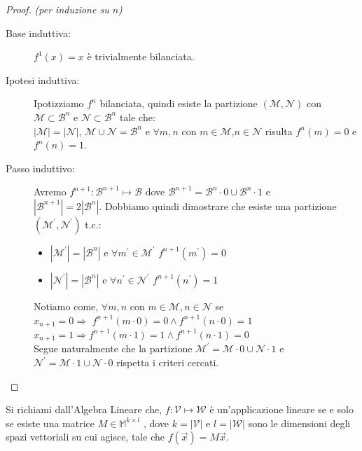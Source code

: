 \documentclass[12pt,a4paper,openright]{report}
\begin{document}
\begin{proof}
    \textit{(per induzione su $n$)\\}
    \begin{description}
        \item[Base induttiva:] $f^1(x)=x$ è trivialmente bilanciata.
        \item[Ipotesi induttiva:] Ipotizziamo $f^n$ bilanciata, quindi esiste la partizione $(\mathcal{M},\mathcal{N})$ con $\mathcal{M}\subset\mathcal{B}^n$ e $\mathcal{N}\subset\mathcal{B}^n$ tale che:\\
                                      ${\left\vert{\mathcal{M}}\right\vert} = {\left\vert{\mathcal{N}}\right\vert}$, $\mathcal{M} \cup \mathcal{N} = \mathcal{B}^n$ e $\forall m,n$ con
                                      $m\in\mathcal{M}$,$n \in\mathcal{N}$ risulta $f^n(m) = 0$ e $ f^n(n) = 1$.
        \item[Passo induttivo:] Avremo $f^{n+1}:\mathcal{B}^{n+1}\mapsto\mathcal{B}$ dove  $\mathcal{B}^{n+1} = \mathcal{B}^n\cdot0 \cup \mathcal{B}^n\cdot1$ e\\
                                     $\left\vert\mathcal{B}^{n+1}\right\vert = 2\left\vert\mathcal{B}^{n}\right\vert$. Dobbiamo quindi dimostrare che esiste una partizione
                                     $(\mathcal{M^\prime},\mathcal{N^\prime})$ t.c.:
                                     \begin{itemize}
                                        \item $\left\vert\mathcal{M^\prime}\right\vert=\left\vert\mathcal{B}^{n}\right\vert$ e $\forall m^\prime \in \mathcal{M^\prime}$ $f^{n+1}(m^\prime) = 0$ 
                                        \item $\left\vert\mathcal{N^\prime}\right\vert=\left\vert\mathcal{B}^{n}\right\vert$ e $\forall n^\prime \in \mathcal{N^\prime}$ $f^{n+1}(n^\prime) = 1$   
                                      \end{itemize}
                                      Notiamo come, $\forall m,n$ con $ m\in\mathcal{M},n\in\mathcal{N}$ se\\
                                      $x_{n+1} = 0 \Rightarrow $ $f^{n+1}(m\cdot0)=0 \land f^{n+1}(n\cdot0)=1$\\
                                      $x_{n+1} = 1 \Rightarrow $$f^{n+1}(m\cdot1)=1 \land f^{n+1}(n\cdot1)=0$\\
                                      Segue naturalmente che la partizione $\mathcal{M^\prime} = \mathcal{M}\cdot0 \cup \mathcal{N}\cdot1$ e $\mathcal{N^\prime} = \mathcal{M}\cdot1 \cup \mathcal{N}\cdot0$
                                      rispetta i criteri cercati. 
    \end{description}      
\end{proof}
\par
Si richiami dall'Algebra Lineare che, $f:\mathcal{V}\mapsto\mathcal{W}$ è un'applicazione lineare se e solo se esiste una matrice $M \in \mathbb{M}^{k \times l}$
, dove $k = \left\vert\mathcal{V}\right\vert$ e $l = \left\vert\mathcal{W}\right\vert$ sono le dimensioni degli spazi vettoriali su cui agisce, tale che $f(\vec{x})=M\vec{x}$.\\
\end{document}
